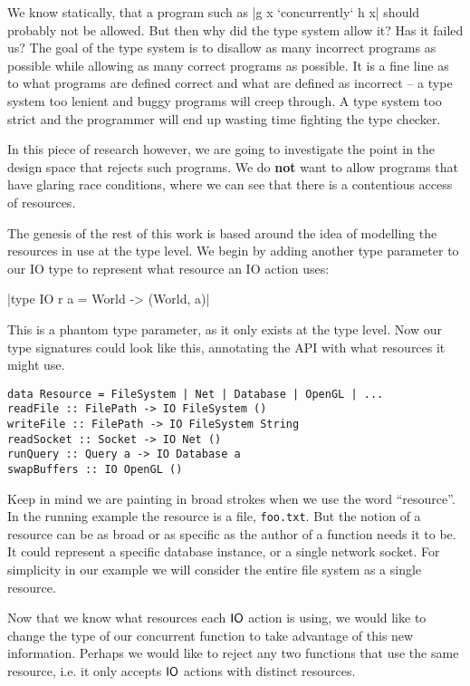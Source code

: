 \documentclass{report}
\begin{document}
We know statically, that a program such as |g x `concurrently` h
x| should probably not be allowed. But then why did the type system allow it?
Has it failed us? The goal of the type system is to disallow as many incorrect
programs as possible while allowing as many correct programs as possible. It is
a fine line as to what programs are defined correct and what are defined as
incorrect -- a type system too lenient and buggy programs will creep through. A
type system too strict and the programmer will end up wasting time fighting the
type checker.

In this piece of research however, we are going to investigate the point in the
design space that rejects such programs. We do \textbf{not} want to allow
programs that have glaring race conditions, where we can see that there is a
contentious access of resources.

The genesis of the rest of this work is based around the idea of modelling the
resources in use at the type level. We begin by adding another type parameter to
our IO type to represent what resource an IO action uses:

|type IO r a = World -> (World, a)|

This is a phantom type parameter, as it only exists at the type level. Now our
type signatures could look like this, annotating the API with what resources it
might use.

\begin{verbatim}
data Resource = FileSystem | Net | Database | OpenGL | ...
readFile :: FilePath -> IO FileSystem ()
writeFile :: FilePath -> IO FileSystem String
readSocket :: Socket -> IO Net ()
runQuery :: Query a -> IO Database a
swapBuffers :: IO OpenGL ()
\end{verbatim}

Keep in mind we are painting in broad strokes when we use the word
``resource''. In the running example the resource is a file,
\texttt{foo.txt}. But the notion of a resource can be as broad or as specific as
the author of a function needs it to be. It could represent a specific database
instance, or a single network socket. For simplicity in our example we will
consider the entire file system as a single resource.

Now that we know what resources each $\mathsf{IO}$ action is using, we would like to
change the type of our concurrent function to take advantage of this new
information. Perhaps we would like to reject any two functions that use the same
resource, i.e. it only accepts $\mathsf{IO}$ actions with distinct resources.
\end{document}
